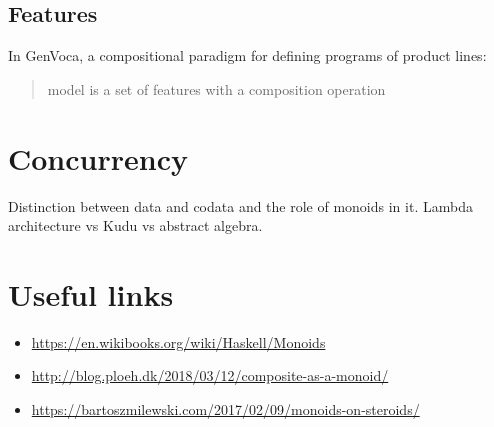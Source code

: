\documentclass{article}
\begin{document}
    \subsection{Features}

    In GenVoca, a compositional paradigm for defining programs of product lines:

    \blockquote{model is a set of features with a composition operation}

    \section{Concurrency}

    Distinction between data and codata and the role of monoids in it.
    Lambda architecture vs Kudu vs abstract algebra.

    \newpage

    \section{Useful links}

    \begin{itemize}
        \item \url{https://en.wikibooks.org/wiki/Haskell/Monoids}
        \item \url{http://blog.ploeh.dk/2018/03/12/composite-as-a-monoid/}
        \item \url{https://bartoszmilewski.com/2017/02/09/monoids-on-steroids/}
    \end{itemize}
\end{document}
